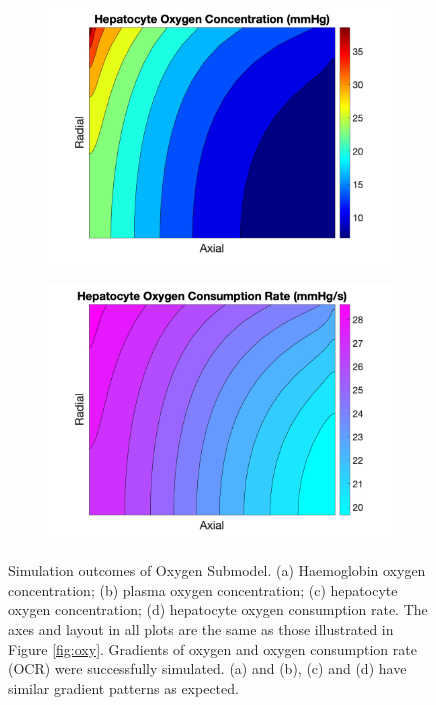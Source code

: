 \documentclass[12pt]{article}
\begin{document}
\begin{figure}[ht]
\begin{subfigure}{0.5\textwidth}
    \includegraphics[width=\linewidth]{hepa.png} 
    \caption{}
    \label{fig:oxy_3}
\end{subfigure}
\hfill
\begin{subfigure}{0.5\textwidth}
\centering
    \includegraphics[width=\linewidth]{ocr.png} 
    \caption{}
    \label{fig:oxy_4}
\end{subfigure}
\hfill
  \caption{Simulation outcomes of Oxygen Submodel. (a) Haemoglobin oxygen concentration; (b) plasma oxygen concentration; (c) hepatocyte oxygen concentration; (d) hepatocyte oxygen consumption rate. The axes and layout in all plots are the same as those illustrated in Figure \ref{fig:oxy}. Gradients of oxygen and oxygen consumption rate (OCR) were successfully simulated. (a) and (b), (c) and (d) have similar gradient patterns as expected.}
  \label{fig:quad} 
\end{figure}
\end{document}
